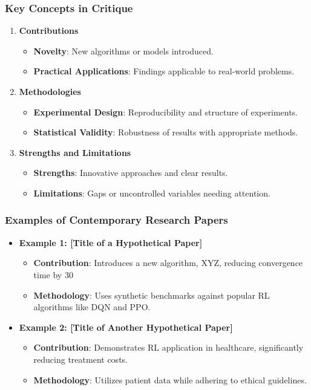 \documentclass{beamer}
\begin{document}
\begin{frame}[fragile]
    \frametitle{Key Concepts in Critique}
    \begin{enumerate}
        \item \textbf{Contributions}
            \begin{itemize}
                \item \textbf{Novelty}: New algorithms or models introduced.
                \item \textbf{Practical Applications}: Findings applicable to real-world problems.
            \end{itemize}
        \item \textbf{Methodologies}
            \begin{itemize}
                \item \textbf{Experimental Design}: Reproducibility and structure of experiments.
                \item \textbf{Statistical Validity}: Robustness of results with appropriate methods.
            \end{itemize}
        \item \textbf{Strengths and Limitations}
            \begin{itemize}
                \item \textbf{Strengths}: Innovative approaches and clear results.
                \item \textbf{Limitations}: Gaps or uncontrolled variables needing attention.
            \end{itemize}
    \end{enumerate}
\end{frame}

\begin{frame}[fragile]
    \frametitle{Examples of Contemporary Research Papers}
    \begin{itemize}
        \item \textbf{Example 1: [Title of a Hypothetical Paper]}
            \begin{itemize}
                \item \textbf{Contribution}: Introduces a new algorithm, XYZ, reducing convergence time by 30%
                \item \textbf{Methodology}: Uses synthetic benchmarks against popular RL algorithms like DQN and PPO.
            \end{itemize}
        \item \textbf{Example 2: [Title of Another Hypothetical Paper]}
            \begin{itemize}
                \item \textbf{Contribution}: Demonstrates RL application in healthcare, significantly reducing treatment costs.
                \item \textbf{Methodology}: Utilizes patient data while adhering to ethical guidelines.
            \end{itemize}
    \end{itemize}
\end{frame}
\end{document}
